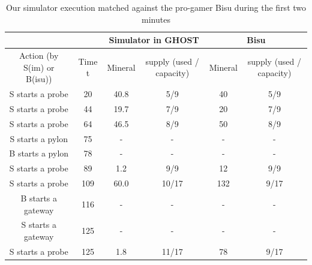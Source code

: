 \documentclass[journal]{IEEEtran}
\newcommand{\ghost}{\textsc{GHOST}\xspace}
\begin{document}
\begin{table}[ht]
  \caption{Our simulator execution matched  against the pro-gamer Bisu
    during the first two minutes}
  \label{tab:korean}
  \centering
  \begin{tabular}{|c|c|c|c|c|c|} 
    \cline{3-6}
    \multicolumn{2}{c|}{} & \multicolumn{2}{c|}{Simulator in \ghost} & \multicolumn{2}{c|}{Bisu}\\ 
    \hline
    Action (by S(im) or B(isu)) & Time t & \multicolumn{1}{c|}{Mineral} & \multicolumn{1}{c|}{supply (used / capacity)} & \multicolumn{1}{c|}{Mineral} & \multicolumn{1}{c|}{supply (used / capacity)}\\
    \hline
    S starts a probe & 20 & 40.8 & 5/9 & 40 & 5/9\\
    S starts a probe & 44 & 19.7 & 7/9 & 20 & 7/9\\
    S starts a probe & 64 & 46.5 & 8/9 & 50 & 8/9\\
    S starts a pylon & 75 & - & - & - & -\\
    B starts a pylon & 78 & - & - & - & -\\
    S starts a probe & 89 & 1.2 & 9/9 & 12 & 9/9\\
    S starts a probe & 109 & 60.0 & 10/17 & 132 & 9/17\\
    B starts a gateway & 116 & - & - & - & -\\
    S starts a gateway & 125 & - & - & - & -\\
    S starts a probe & 125 & 1.8 & 11/17 & 78 & 9/17\\
    \hline    
  \end{tabular}
\end{table}
\end{document}
